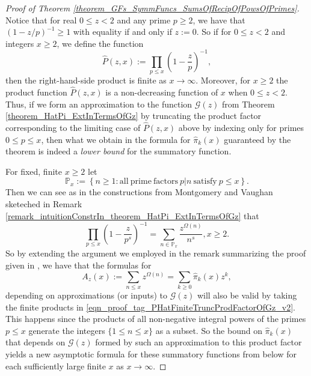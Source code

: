 \documentclass[11pt,reqno,a4letter]{article}
\numberwithin{figure}{section}
\numberwithin{table}{section}
\theoremstyle{plain}
\numberwithin{theorem}{section}
\theoremstyle{definition}
\newcommand{\NBRef}[1]{}
\begin{document}
\NBRef{A06-2020-04-26} 
\begin{proof}[Proof of Theorem \ref{theorem_GFs_SymmFuncs_SumsOfRecipOfPowsOfPrimes}] 
\label{proofOf_theorem_GFs_SymmFuncs_SumsOfRecipOfPowsOfPrimes} 
Notice that for real $0 \leq z < 2$ and any prime $p \geq 2$, we have that 
$\left(1-z/p\right)^{-1} \geq 1$ with equality if and only if $z := 0$. 
So if for $0 \leq z < 2$ and integers $x \geq 2$, we define the function 
\[
\widehat{P}(z, x) := \prod_{p \leq x} \left(1 - \frac{z}{p}\right)^{-1}, 
\]
then the right-hand-side product is finite as $x \rightarrow \infty$. 
Moreover, for $x \geq 2$ the product function $\widehat{P}(z, x)$ is a non-decreasing 
function of $x$ when $0 \leq z < 2$. Thus, if we form an approximation to the function 
$\mathcal{G}(z)$ from Theorem \ref{theorem_HatPi_ExtInTermsOfGz} by truncating the 
product factor corresponding to the limiting case of 
$\widehat{P}(z, x)$ above by indexing only for primes $0 \leq p \leq x$, then what we 
obtain in the formula for $\widehat{\pi}_k(x)$ 
guaranteed by the theorem is indeed a \emph{lower bound} for the summatory function. 

For fixed, finite $x \geq 2$ let 
\[
\mathbb{P}_x := \left\{n \geq 1: \mathrm{ all\ prime\ factors\ } 
     p|n \mathrm{\ satisfy\ } p \leq x\right\}. 
\]
Then we can see as in the constructions from Montgomery and Vaughan sketeched in 
Remark \ref{remark_intuitionConstrIn_theorem_HatPi_ExtInTermsOfGz} that 
\begin{equation} 
\label{eqn_proof_tag_PHatFiniteTruncProdFactorOfGz_v2} 
\prod_{p \leq x} \left(1 - \frac{z}{p^s}\right)^{-1} = \sum_{n \in \mathbb{P}_x} 
     \frac{z^{\Omega(n)}}{n^s}, x \geq 2. 
\end{equation} 
So by extending the argument we employed in the remark summarizing the proof given in 
\cite[\S 7.4]{MV}, we have that the formulas for 
\[
A_z(x) := \sum_{n \leq x} z^{\Omega(n)} = \sum_{k \geq 0} \widehat{\pi}_k(x) z^k, 
\]
depending on approximations (or inputs) to $\mathcal{G}(z)$ will also be valid by taking 
the finite products in \eqref{eqn_proof_tag_PHatFiniteTruncProdFactorOfGz_v2}. 
This happens since the products of all non-negative integral powers of the 
primes $p \leq x$ generate the integers $\{1 \leq n \leq x\}$ as a subset. 
So the bound on $\widehat{\pi}_k(x)$ that depends on $\mathcal{G}(z)$ formed by such 
an approximation to this product factor yields a new asymptotic formula for these 
summatory functions from below for each sufficiently large finite $x$ as 
$x \rightarrow \infty$. 


\end{proof}
\end{document}
